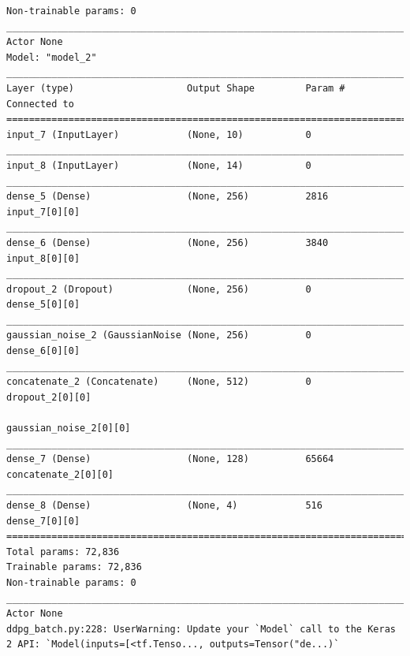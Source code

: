 \documentclass[man, 12pt]{apa6}
\begin{document}
\begin{verbatim}
Non-trainable params: 0
__________________________________________________________________________________________________
Actor None
Model: "model_2"
__________________________________________________________________________________________________
Layer (type)                    Output Shape         Param #     Connected to                     
==================================================================================================
input_7 (InputLayer)            (None, 10)           0                                            
__________________________________________________________________________________________________
input_8 (InputLayer)            (None, 14)           0                                            
__________________________________________________________________________________________________
dense_5 (Dense)                 (None, 256)          2816        input_7[0][0]                    
__________________________________________________________________________________________________
dense_6 (Dense)                 (None, 256)          3840        input_8[0][0]                    
__________________________________________________________________________________________________
dropout_2 (Dropout)             (None, 256)          0           dense_5[0][0]                    
__________________________________________________________________________________________________
gaussian_noise_2 (GaussianNoise (None, 256)          0           dense_6[0][0]                    
__________________________________________________________________________________________________
concatenate_2 (Concatenate)     (None, 512)          0           dropout_2[0][0]                  
                                                                 gaussian_noise_2[0][0]           
__________________________________________________________________________________________________
dense_7 (Dense)                 (None, 128)          65664       concatenate_2[0][0]              
__________________________________________________________________________________________________
dense_8 (Dense)                 (None, 4)            516         dense_7[0][0]                    
==================================================================================================
Total params: 72,836
Trainable params: 72,836
Non-trainable params: 0
__________________________________________________________________________________________________
Actor None
ddpg_batch.py:228: UserWarning: Update your `Model` call to the Keras 2 API: `Model(inputs=[<tf.Tenso..., outputs=Tensor("de...)`

\end{verbatim}
\end{document}
